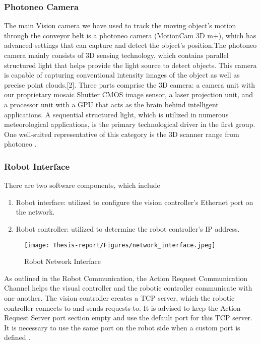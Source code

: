 \documentclass[12pt]{article}
\begin{document}
\subsubsection{Photoneo Camera}
The main Vision camera we have used to track the moving object's motion through the conveyor belt is a photoneo camera (MotionCam 3D m+), which has advanced settings that can capture and detect the object's position.The photoneo camera mainly consists of 3D sensing technology, which contains parallel structured light that helps provide the light source to detect objects. This camera is capable of capturing conventional intensity images of the object as well as precise point clouds.[2]. Three parts comprise the 3D camera: a camera unit with our proprietary mosaic Shutter CMOS image sensor, a laser projection unit, and a processor unit with a GPU that acts as the brain behind intelligent applications. A sequential structured light, which is utilized in numerous meteorological applications, is the primary technological driver in the first group. One well-suited representative of this category is the 3D scanner range from photoneo \cite{ref2}. \

\subsubsection{Robot Interface}
There are two software components, which include
\begin{enumerate}
    \item   Robot interface: utilized to configure the vision controller's Ethernet port on the network\cite{ref2}.
    \item   Robot controller: utilized to determine the robot controller's IP address\cite{ref2}.
\end{enumerate}
\begin{figure}[h]
    \centering
    \texttt{[image: Thesis-report/Figures/network\_interface.jpeg]}
    \caption{Robot Network Interface\cite{ref2}}
    \label{fig:network-interface}
\end{figure}
 As outlined in the Robot Communication, the Action Request Communication Channel helps the visual controller and the robotic controller communicate with one another.  The vision controller creates a TCP server, which the robotic controller connects to and sends requests to.
 It is advised to keep the Action Request Server port section empty and use the default port for this TCP server.  It is necessary to use the same port on the robot side when a custom port is defined \cite{ref2}.
\end{document}
